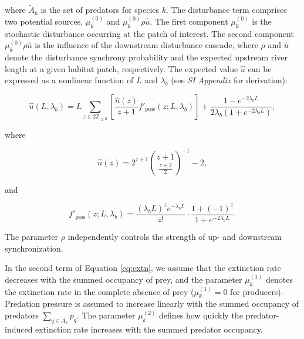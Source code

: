 \documentclass[11pt, class=article, crop=false]{standalone}
\begin{document}
where $\tilde{A}_{k}$ is the set of predators for species $k$.
The disturbance term comprises two potential sources, $\mu^{(0)}_k$ and $\mu^{(0)}_k \rho \hat{u}$.
The first component $\mu^{(0)}_k$ is the stochastic disturbance occurring at the patch of interest.
The second component $\mu^{(0)}_k \rho \hat{u}$ is the influence of the downstream disturbance cascade, where $\rho$ and $\hat{u}$ denote the disturbance synchrony probability and the expected upstream river length at a given habitat patch, respectively.
The expected value $\hat{u}$ can be expressed as a nonlinear function of $L$ and $\lambda_b$ (see \textit{SI Appendix} for derivation):

\begin{equation}
    \hat{u}(L, \lambda_b) = L \sum_{z \in 2\mathbb{Z}_{\ge 0}} \left[ \frac{\hat{n}(z)}{z + 1} f'_{\text{pois}}(z; L, \lambda_b)\right] + \frac{1 - e^{-2 \lambda_b L}}{2 \lambda_b (1 + e^{-2 \lambda_b L})},
\end{equation}

where

\begin{equation}
    \hat{n}(z) = 2^{z + 1} \binom{z + 1}{\frac{z + 2}{2}}^{-1} - 2,
\end{equation}

and

\begin{equation}
    f'_{\text{pois}}(z; L, \lambda_b) = \frac{(\lambda_b L)^z e^{-\lambda_b L}}{z!} \cdot \frac{1 + (-1)^{z}}{1 + e^{-2\lambda_b L}}.
\end{equation}

The parameter $\rho$ independently controls the strength of up- and downstream synchronization.

In the second term of Equation \ref{eq:extn}, we assume that the extinction rate decreases with the summed occupancy of prey, and the parameter $\mu_{k}^{(1)}$ denotes the extinction rate in the complete absence of prey ($\mu_{k}^{(1)} = 0$ for producers).
Predation pressure is assumed to increase linearly with the summed occupancy of predators $\sum_{q \in \tilde{A}_{k}} p_{q}$.
The parameter $\mu_{k}^{(2)}$ defines how quickly the predator-induced extinction rate increases with the summed predator occupancy.
\end{document}
